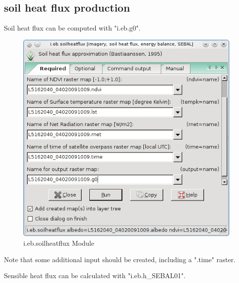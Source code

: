 \subsection{soil heat flux production}
Soil heat flux can be computed with "i.eb.g0".\newline

\begin{figure}[htbp]
   \centering
   \includegraphics[scale=0.4]{gipe026.png}
   \caption{i.eb.soilheatflux Module}
   \label{fig:gipe026}
\end{figure}

Note that some additional input should be created, including a ".time" raster.\newline

Sensible heat flux can be calculated with "i.eb.h\_SEBAL01".\newline

